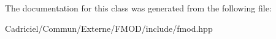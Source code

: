 The documentation for this class was generated from the following file\-:\begin{DoxyCompactItemize}
\item 
Cadriciel/\-Commun/\-Externe/\-F\-M\-O\-D/include/fmod.\-hpp\end{DoxyCompactItemize}

